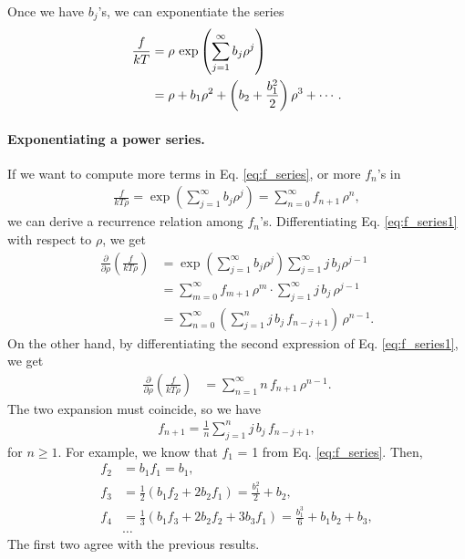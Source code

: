 \documentclass[twocolumn, 10pt]{article}
\numberwithin{equation}{section}
\newenvironment{solution}[1][\empty]
{\par\medskip\sffamily
  \textbf{\ifx\empty#1{Solution.}\relax\else{#1}\fi} \ignorespaces}
{\medskip}
\begin{document}
\begin{solution}
  Once we have $b_j$'s, we can exponentiate the series
  \begin{align}
    \frac{f}{kT}
    &=
    \rho \,
    \exp\left( \sum_{j=1}^\infty b_j\rho^j \right)
    \notag \\
    &=
    \rho + b_1 \rho^2 + \left(b_2 + \frac{b_1^2}{2} \right) \rho^3
    + \cdots
    .
    \label{eq:f_series}
  \end{align}

\paragraph*{Exponentiating a power series.}
  If we want to compute more terms in Eq. \eqref{eq:f_series},
  or more $f_n$'s in
  \begin{align}
    \frac{ f } { k T \rho }
    =
    \exp\left( \sum_{j=1}^\infty b_j\rho^j \right)
    =
    \sum_{n = 0}^\infty f_{n+1} \, \rho^n
    ,
    \label{eq:f_series1}
  \end{align}
  we can derive a recurrence relation among $f_n$'s.
  Differentiating Eq. \eqref{eq:f_series1}
  with respect to $\rho$, we get
  \begin{align*}
    \frac{\partial}{\partial \rho}
    \left( \frac{ f } { k T \rho } \right)
    &=
    \exp\left( \sum_{j=1}^\infty b_j\rho^j \right)
    \sum_{j=1}^\infty j \, b_j\rho^{j-1}
    \\
    &=
    \sum_{m=0}^\infty f_{m+1} \, \rho^m
    \cdot
    \sum_{j=1}^\infty j \, b_j \, \rho^{j-1}
    \\
    &=
    \sum_{n=0}^\infty
    \left(
    \sum_{j=1}^n
    j \, b_j \, f_{n-j+1}
    \right)
    \, \rho^{n - 1}
    .
  \end{align*}
  On the other hand,
  by differentiating the second expression of Eq. \eqref{eq:f_series1},
  we get
  \begin{align*}
    \frac{\partial}{\partial \rho}
    \left( \frac{ f } { k T \rho } \right)
    &=
    \sum_{n=1}^\infty
    n \, f_{n+1} \, \rho^{n-1}
    .
  \end{align*}
  The two expansion must coincide, so we have
  \begin{align}
    f_{n+1}
    =
    \frac{1}{n}
    \sum_{j=1}^n
    j \, b_j \, f_{n-j+1}
    ,
    \label{eq:f_recur}
  \end{align}
  for $n \ge 1$.
  For example, we know that  $f_1$ = 1 from Eq. \eqref{eq:f_series}.
  Then,
  \begin{align*}
  f_2 &= b_1 f_1 = b_1, \\
  f_3 &= \frac{1}{2}( b_1 f_2 + 2 b_2 f_1) = \frac{b_1^2}{2} + b_2, \\
  f_4 &= \frac{1}{3}( b_1 f_3 + 2 b_2 f_2 + 3 b_3 f_1)
    = \frac{b_1^3}{6} + b_1 b_2 + b_3, \\
  &\dots
  \end{align*}
  The first two agree with the previous results.



\end{solution}
\end{document}
